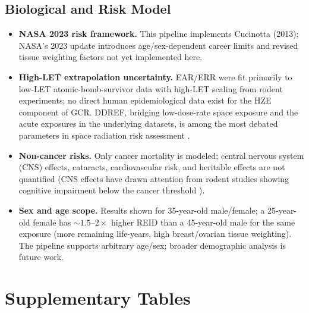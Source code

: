 \documentclass[a4paper,fleqn]{cas-sc}
\begin{document}
\subsection{Biological and Risk Model}
\begin{itemize}
  \item \textbf{NASA 2023 risk framework.} This pipeline implements
        Cucinotta (2013); NASA's 2023 update introduces age/sex-dependent
        career limits and revised tissue weighting factors not yet
        implemented here.
  \item \textbf{High-LET extrapolation uncertainty.} EAR/ERR were fit
        primarily to low-LET atomic-bomb-survivor data with high-LET scaling
        from rodent experiments; no direct human epidemiological data exist
        for the HZE component of GCR. DDREF, bridging low-dose-rate space
        exposure and the acute exposures in the underlying datasets, is
        among the most debated parameters in space radiation risk assessment
        \citep{durant2013}.
  \item \textbf{Non-cancer risks.} Only cancer mortality is modeled; central
        nervous system (CNS)
        effects, cataracts, cardiovascular risk, and heritable effects are
        not quantified (CNS effects have drawn attention from rodent studies
        showing cognitive impairment below the cancer threshold
        \citep{cucinotta2014cns}).
  \item \textbf{Sex and age scope.} Results shown for 35-year-old male/female;
        a 25-year-old female has $\sim\!1.5$--$2\times$ higher REID than a
        45-year-old male for the same exposure (more remaining life-years,
        high breast/ovarian tissue weighting). The pipeline supports
        arbitrary age/sex; broader demographic analysis is future work.
\end{itemize}

\section{Supplementary Tables}
\end{document}
